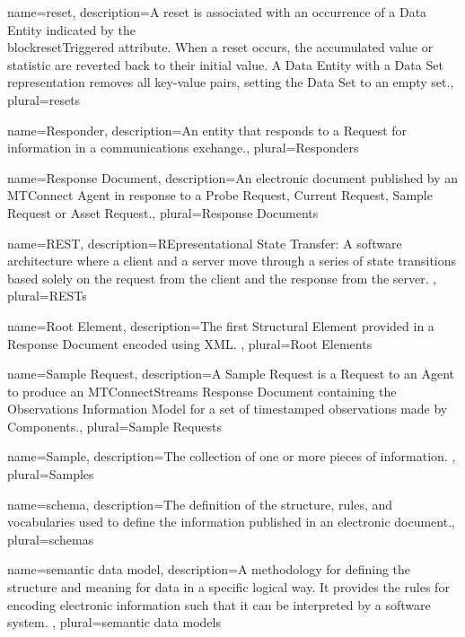 {
    name={reset},
	description={A reset is associated with an occurrence of a \gls{Data Entity} indicated by the \\block{resetTriggered} attribute. When a reset occurs, the accumulated value or statistic are reverted back to their initial value. A \gls{Data Entity} with a \gls{Data Set} representation removes all \glspl{key-value pair}, setting the \gls{Data Set} to an empty set.},
	plural={resets}
}

{
    name={Responder},
	description={An entity that responds to a \gls{Request} for information in a communications exchange.},
	plural={Responders}
}

{
    name={Response Document},
	description={An electronic document published by an \gls{MTConnect Agent} in response to a \gls{Probe Request}, \gls{Current Request}, \gls{Sample Request} or \gls{Asset Request}.},
	plural={Response Documents}
}

{
    name={REST},
	description={REpresentational State Transfer:  A software architecture where a client and a server move through a series of state transitions based solely on the request from the client and the response from the server. 
},
	plural={RESTs}
}

{
    name={Root Element},
	description={The first \gls{Structural Element} provided in a \gls{Response Document} encoded using XML. },
	plural={Root Elements}
}

{
    name={Sample Request},
	description={A \gls{Sample Request} is a \gls{Request} to an \gls{Agent} to produce an \gls{MTConnectStreams Response Document} containing the \gls{Observations Information Model} for a set of timestamped \glspl{observation} made by \glspl{Component}.},
	plural={Sample Requests}
}

{
    name={Sample},
	description={The collection of one or more pieces of information.  
},
	plural={Samples}
}

{
    name={schema},
	description={The definition of the structure, rules, and vocabularies used to define the information published in an electronic document.},
	plural={schemas}
}

{
    name={semantic data model},
	description={A methodology for defining the structure and meaning for data in a specific logical way. It provides the rules for encoding electronic information such that it can be interpreted by a software system. },
	plural={semantic data models}
}

